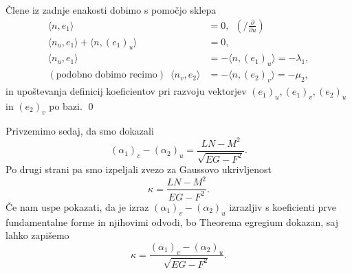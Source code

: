 Člene iz zadnje enakosti dobimo s pomočjo sklepa \begin{align*}
     \langle n, e_1 \rangle &= 0, \,\,\, \left(\bigg/ \frac{ \partial  }{ \partial u } \right) \\
     \langle n_u, e_1 \rangle + \langle  n, (e_1)_u \rangle  &= 0, \\
     \langle n_u, e_1 \rangle &= - \langle n, (e_1)_u \rangle = - \lambda_1, \\
     (\text{podobno dobimo recimo}) \,\,\, \langle n_v, e_2 \rangle &= - \langle n, (e_2)_v \rangle = -\mu_2,   
\end{align*}
in upoštevanja definicij koeficientov pri razvoju vektorjev $(e_1)_u, (e_1)_v, (e_2)_u$ in $(e_2)_v$ po bazi.
\qed

Privzemimo sedaj, da smo dokazali \begin{equation*}
(\alpha_1)_v - (\alpha_2)_u = \frac{LN - M^2}{\sqrt{EG - F^2}}.  
\end{equation*}  
 Po drugi strani pa smo izpeljali zvezo za Gaussovo ukrivljenost \begin{equation*}
    \kappa = \frac{LN - M^2}{EG - F^2}.
 \end{equation*}  
Če nam uspe pokazati, da je izraz $(\alpha_1)_v - (\alpha_2)_u$ izrazljiv s koeficienti prve fundamentalne forme in njihovimi odvodi, bo Theorema egregium dokazan, saj lahko zapišemo \begin{equation*}
\kappa = \frac{(\alpha_1)_v - (\alpha_2)_u}{\sqrt{EG - F^2}}.
\end{equation*}  

